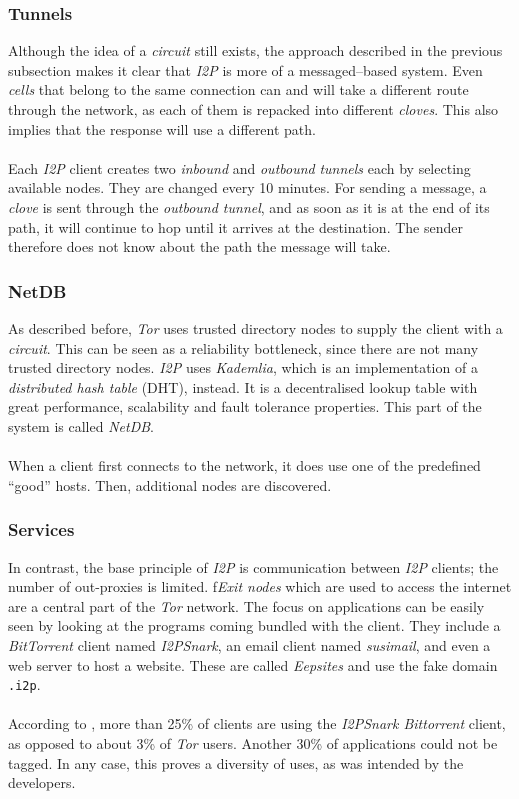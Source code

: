 \documentclass{sig-alternate}
\begin{document}
\subsubsection{Tunnels}
Although the idea of a \emph{circuit} still exists, the approach described in the previous subsection makes it clear that \emph{I2P} is more of a messaged--based system.
Even \emph{cells} that belong to the same connection can and will take a different route through the network, as each of them is repacked into different \emph{cloves}.
This also implies that the response will use a different path.
\\
\\
Each \emph{I2P} client creates two \emph{inbound} and \emph{outbound} \emph{tunnels} each by selecting available nodes.
They are changed every 10 minutes.
For sending a message, a \emph{clove} is sent through the \emph{outbound tunnel}, and as soon as it is at the end of its path, it will continue to hop until it arrives at the destination.
The sender therefore does not know about the path the message will take\cite{olivier2011}.
\subsubsection{NetDB}
As described before, \emph{Tor} uses trusted directory nodes to supply the client with a \emph{circuit}.
This can be seen as a reliability bottleneck, since there are not many trusted directory nodes.
\emph{I2P} uses \emph{Kademlia}, which is an implementation of a \emph{distributed hash table} (DHT), instead.
It is a decentralised lookup table with great performance, scalability and fault tolerance properties.
This part of the system is called \emph{NetDB}.
\\
\\
When a client first connects to the network, it does use one of the predefined ``good'' hosts.
Then, additional nodes are discovered.

\subsubsection{Services}
In contrast, the base principle of \emph{I2P} is communication between \emph{I2P} clients; the number of out-proxies is limited\cite{olivier2011}.
f\emph{Exit nodes} which are used to access the internet are a central part of the \emph{Tor} network.
The focus on applications can be easily seen by looking at the programs coming bundled with the client.
They include a \emph{BitTorrent} client named \emph{I2PSnark}, an email client named \emph{susimail}, and even a web server to host a website\cite{i2p}.
These are called \emph{Eepsites} and use the fake domain \texttt{.i2p}.
\\
\\
According to \cite{olivier2011}, more than 25\% of clients are using the \emph{I2PSnark Bittorrent} client, as opposed to about 3\% of \emph{Tor} users.
Another 30\% of applications could not be tagged.
In any case, this proves a diversity of uses, as was intended by the developers.
\end{document}
